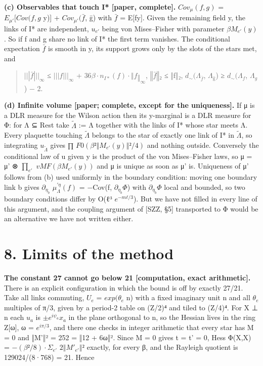 \documentclass[11pt,a4paper]{article}
\theoremstyle{named}
\begin{document}
\textbf{(c) Observables that touch I* [paper, complete].} $Cov_{μ}(f,g)$ = $E_{μ'}[Cov(f,g$ \textbar{} y)] + $Cov_{μ'}(\bar{f}$, ḡ) with $\bar{f}$ = E[f\textbar{}y]. Given the remaining field y, the links of I* are independent, $u_{e'}$ being von Mises–Fisher with parameter $βM_{e'}(y)$. So if f and g share no link of I* the first term vanishes. The conditional expectation $\bar{f}$ is smooth in y, its support grows only by the slots of the stars met, and

\begin{quote}
$|||\bar{f}|||_{∞}$ ≤ $|||f|||_{∞}$ + $36β·n_{I*}(f)·‖f‖_{∞}$,  $‖\bar{f}‖₂$ ≤ ‖f‖₂,  $d_{∼}(Λ_{\bar{f}}$, $Λ_{ḡ}$) ≥ $d_{∼}(Λ_f$, $Λ_g$) − 2.
\end{quote}
\textbf{(d) Infinite volume [paper; complete, except for the uniqueness].} If μ is a DLR measure for the Wilson action then its y-marginal is a DLR measure for Φ: for Λ ⊆ Rest take $\tilde{Λ}$ := Λ together with the links of I* whose star meets Λ. Every plaquette touching $\tilde{Λ}$ belongs to the star of exactly one link of I* in $\tilde{Λ}$, so integrating $u_{\tilde{Λ}}$ gives ∏ $F0(β²‖M_{e'}(y)‖²/4)$ and nothing outside. Conversely the conditional law of u given y is the product of the von Mises–Fisher laws, so μ = μ' ⊗ $∏_{e'}$ $vMF(βM_{e'}(y))$ and μ is unique as soon as μ' is. Uniqueness of μ' follows from (b) used uniformly in the boundary condition: moving one boundary link b gives $∂_{η_b}$ $μ^{\prime η}_{Λ}(f)$ = −Cov(f, $∂_{η_b}Φ$) with $∂_{η_b}Φ$ local and bounded, so two boundary conditions differ by O(ℓ³ $e^{−mℓ/3}$). But we have not filled in every line of this argument, and the coupling argument of [SZZ, §5] transported to Φ would be an alternative we have not written either.

\section*{8. Limits of the method}
\textbf{The constant 27 cannot go below 21 [computation, exact arithmetic].} There is an explicit configuration in which the bound is off by exactly 27/21. Take all links commuting, $U_e$ = $exp(θ_e$ n) with a fixed imaginary unit n and all $θ_e$ multiples of π/3, given by a period-2 table on (Z/2)⁴ and tiled to (Z/4)⁴. For X ⊥ n each $u_a$ is $±e^{iψ_a}x_a$ in the plane orthogonal to n, so the Hessian lives in the ring Z[ω], ω = $e^{iπ/3}$, and there one checks in integer arithmetic that every star has M = 0 and ‖M'‖² = 252 = ‖12 + 6ω‖². Since M = 0 gives t = t' = 0, Hess Φ(X,X) = $−(β²/8)·Σ_{e'}$ $2‖M'_{e'}‖²$ exactly, for every β, and the Rayleigh quotient is 129024/(8·768) = 21. Hence
\end{document}

